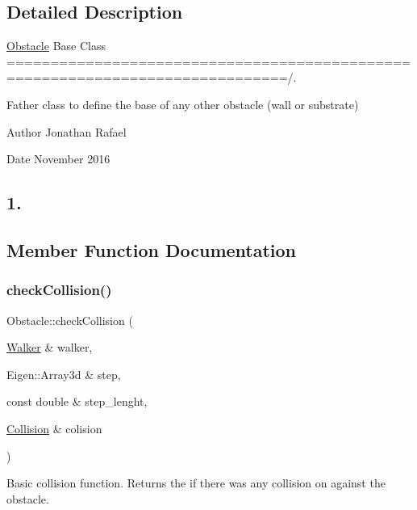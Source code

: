 \subsection{Detailed Description}
\hyperlink{class_obstacle}{Obstacle} Base Class ==============================================================================/. 

Father class to define the base of any other obstacle (wall or substrate) \begin{DoxyAuthor}{Author}
Jonathan Rafael 
\end{DoxyAuthor}
\begin{DoxyDate}{Date}
November 2016 \subsection*{1. }
\end{DoxyDate}


\subsection{Member Function Documentation}
\mbox{\label{class_obstacle_af11af63f11595304ff6d5c1785c03da5}} 
\subsubsection{\texorpdfstring{check\+Collision()}{checkCollision()}}
{\footnotesize\ttfamily Obstacle\+::check\+Collision (\begin{DoxyParamCaption}\item[{\hyperlink{class_walker}{Walker} \&}]{walker,  }\item[{Eigen\+::\+Array3d \&}]{step,  }\item[{const double \&}]{step\+\_\+lenght,  }\item[{\hyperlink{class_collision}{Collision} \&}]{colision }\end{DoxyParamCaption})}



Basic collision function. Returns the if there was any collision on against the obstacle. 


